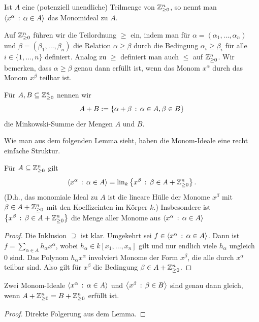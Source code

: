 \documentclass[11pt]{article}
\numberwithin{equation}{section}
\begin{document}
\begin{definition} 
	Ist $A$ eine (potenziell unendliche) Teilmenge von $\mathbb{Z}_{\ge 0}^n$, so nennt man 
	 $\left<  x^\alpha \,:\, \alpha \in A \right>$ das Monomideal zu $A$. 
\end{definition} 



\begin{definition} 
Auf $\mathbb{Z}_{\ge 0}^n$ führen wir die Teilordnung $\ge$ ein, indem man für $\alpha = (\alpha_1,\ldots,\alpha_n)$ und $\beta=  (\beta_1,\ldots, \beta_n)$ die Relation $\alpha \ge \beta$ durch die Bedingung $\alpha_i \ge \beta_i$ für alle $i \in \{1,\ldots,n\}$ definiert. Analog zu $\ge$ definiert man auch $\le$ auf $\mathbb{Z}_{\ge 0}^n$. Wir bemerken, dass $\alpha \ge \beta$ genau dann erfüllt ist, wenn das Monom $x^\alpha$ durch das Monom $x^\beta$ teilbar ist. 
\end{definition} 

\begin{definition} 
Für $A, B \subseteq \mathbb{Z}_{\ge 0}^n$ nennen wir  
\[
	A + B := \left\{  \alpha + \beta \,:\, \alpha \in A, \beta \in B \right\}
\]
 die Minkowski-Summe der Mengen $A$ und $B$. 
\end{definition} 

Wie man aus dem folgenden Lemma sieht, haben die Monom-Ideale eine recht einfache Struktur. 

\begin{lemma} 
	Für $A \subseteq \mathbb{Z}_{\ge 0}^n$ gilt 
	\[
		\left<  x^\alpha \, : \, \alpha \in A  \right> = \operatorname{lin}_k \left\{ x^\beta \,:\, \beta\in A + \mathbb{Z}_{\ge 0}^n \right\}. 
	\]
	(D.h., das monomiale Ideal zu $A$ ist die lineare Hülle der Monome $x^\beta$ mit $\beta \in A + \mathbb{Z}_{\ge 0}^n$ mit den Koeffizeinten im Körper $k$.)
	Insbesondere ist $\left\{  x^\beta  \,:\, \beta \in A + \mathbb{Z}_{\ge 0}^n \right\}$ die Menge aller Monome aus $\left<  x^\alpha \, : \, \alpha \in A  \right>$ 
\end{lemma} 
\begin{proof} 
	Die Inklusion $\supseteq$ ist klar. Umgekehrt sei $f \in \left<  x^\alpha \,:\, \alpha  \in A \right>$. Dann ist 
		$f = \sum_{\alpha \in A} h_\alpha x^\alpha$, 
	wobei $h_\alpha \in k[x_1,\ldots,x_n]$ gilt und nur endlich viele $h_\alpha$ ungleich $0$ sind. Das Polynom $h_\alpha x^\alpha$ involviert Monome der Form $x^\beta$, die alle durch $x^\alpha$ teilbar sind. Also gilt für $x^\beta$ die Bedingung $\beta \in A + \mathbb{Z}_{\ge 0}^n$. 
\end{proof} 

\begin{corollary} \label{cor:mon:ideale} 
	Zwei Monom-Ideale $\left< x^\alpha \, : \, \alpha \in A \right> $ und $\left< x^\beta \, : \, \beta \in B \right>$  sind genau dann gleich, wenn $A + \mathbb{Z}_{\ge 0}^n = B + \mathbb{Z}_{\ge 0}^n$ erfüllt ist. 
\end{corollary} 
\begin{proof}
	Direkte Folgerung aus dem Lemma. 
\end{proof} 
\end{document}
